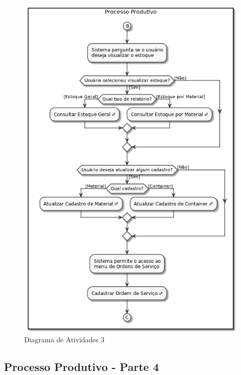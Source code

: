 \documentclass[rascunho,xindy,acronym,symbols]{fei}
\begin{document}
\begin{figure}[H]
    \centering
    \includegraphics[scale=0.6, width=400pt]{./Images/DA_Processo_Produtivo3.png}
    \caption{Diagrama de Atividades 3}
    \label{fig:diag_atv3}
\end{figure}

\subsection{Processo Produtivo - Parte 4}
\end{document}
